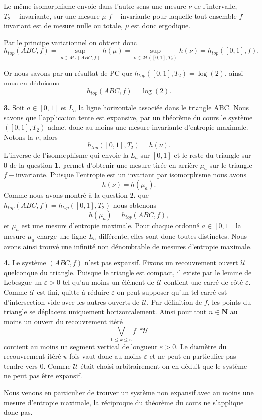 \documentclass[12pt]{article}
\newcommand{\N}{\mathbf{N}}
\begin{document}
Le même isomorphisme envoie dans l'autre sens une mesure $\nu$ de l'intervalle, $T_{2}-$invariante, sur une mesure $\mu$ $f-$invariante pour laquelle tout ensemble $f-$invariant est de mesure nulle ou totale, $\mu$ est donc ergodique.

Par le principe variationnel on obtient donc \[
        h_{top}(ABC,f) = \sup_{\mu \in \mathcal{M}_{e}(ABC,f)}h(\mu) = \sup_{\nu \in \mathcal{M}([0,1], T_{2})}h(\nu) = h_{top}([0,1],f)
.\]

Or nous savons par un résultat de PC que $h_{top}([0,1], T_{2}) = \log(2)$, ainsi nous en déduisons \[
        h_{top}(ABC,f) = \log(2)
.\] 

\bigskip

\textbf{3.} Soit $a \in [0,1]$ et $L_{a}$ la ligne horizontale associée dans le triangle ABC. Nous savons que l'application tente est expansive, par un théorème du cours le système $([0,1], T_{2})$ admet donc au moins une mesure invariante d'entropie maximale. Notons la $\nu$, alors \[
        h_{top}([0,1], T_{2}) = h(\nu)
.\]  L'inverse de l'isomorphisme qui envoie la $L_{a}$ sur $[0,1]$ et le reste du triangle sur 0 de la question \textbf{1.} permet d'obtenir une mesure tirée en arrière $\mu_{a}$ sur le triangle $f-$invariante. Puisque l'entropie est un invariant par isomorphisme nous avons  \[
        h(\nu) = h(\mu_{a})
.\] Comme nous avons montré à la question \textbf{2.} que $h_{top}(ABC,f) = h_{top}([0,1],T_{2})$ nous obtenons \[
h(\mu_{a}) = h_{top}(ABC,f)
,\] et $\mu_{a}$ est une mesure d'entropie maximale. Pour chaque ordonné $a \in [0,1]$ la mesure $\mu_{a}$ charge une ligne $L_{a}$ différente, elles sont donc toutes distinctes. Nous avons ainsi trouvé une infinité non dénombrable de mesures d'entropie maximale.
\bigskip

\textbf{4.} Le système $(ABC,f)$ n'est pas expansif. Fixons un recouvrement ouvert $\mathcal{U}$ quelconque du triangle. Puisque le triangle est compact, il existe par le lemme de Lebesgue un $\varepsilon > 0$ tel qu'au moins un élément de $\mathcal{U}$ contient une carré de côté $\varepsilon$. Comme $\mathcal{U}$ est fini, quitte à réduire $\varepsilon$ on peut supposer qu'un tel carré est d'intersection vide avec les autres ouverts de $\mathcal{U}$. Par définition de $f$, les points du triangle se déplacent uniquement horizontalement. Ainsi pour tout $n \in \N$ au moins un ouvert du recouvrement itéré  \[
\bigvee_{0\le k \le n}f^{-k}\mathcal{U}
\] contient au moins un segment vertical de longueur $\varepsilon > 0$. Le diamètre du recouvrement itéré $n$ fois vaut donc au moins $\varepsilon$ et ne peut en particulier pas tendre vers 0. Comme  $\mathcal{U}$ était choisi arbitrairement on en déduit que le système ne peut pas être expansif.

\medskip

Nous venons en particulier de trouver un système non expansif avec au moins une mesure d'entropie maximale, la réciproque du théorème du cours ne s'applique donc pas.
\end{document}
